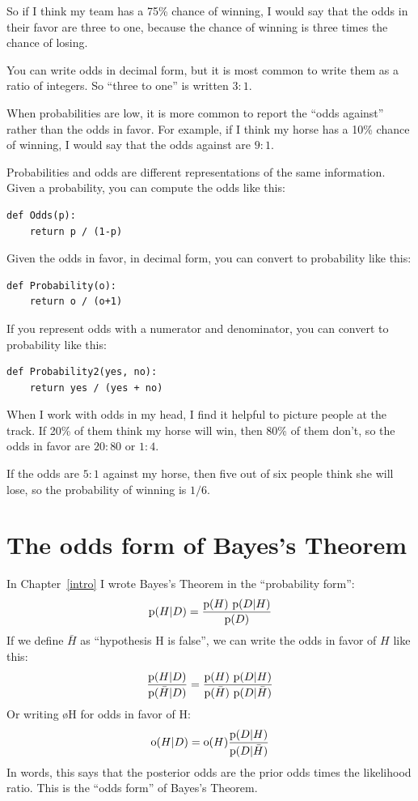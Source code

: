 \documentclass[12pt]{book}
\begin{document}
So if I think my team has a 75\% chance of winning, I would
say that the odds in their favor are three to one, because
the chance of winning is three times the chance of losing.

You can write odds in decimal form, but it is most common to
write them as a ratio of integers.  So ``three to one'' is
written $3:1$.

When probabilities are low, it is more common to report the
``odds against'' rather than the odds in favor.  For
example, if I think my horse has a 10\% chance of winning,
I would say that the odds against are $9:1$.

Probabilities and odds are different representations of the
same information.  Given a probability, you can compute the
odds like this:

\begin{verbatim}
def Odds(p):
    return p / (1-p)
\end{verbatim}

Given the odds in favor, in decimal form, you can convert to
probability like this:

\begin{verbatim}
def Probability(o):
    return o / (o+1)
\end{verbatim}

If you represent odds with a numerator and denominator, you
can convert to probability like this:

\begin{verbatim}
def Probability2(yes, no):
    return yes / (yes + no)
\end{verbatim}

When I work with odds in my head, I find it helpful to picture
people at the track.  If 20\% of them think my horse will win,
then 80\% of them don't, so the odds in favor are $20:80$ or
$1:4$.

If the odds are $5:1$ against my horse, then five out of six
people think she will lose, so the probability of winning
is $1/6$.


\section{The odds form of Bayes's Theorem}

In Chapter~\ref{intro} I wrote Bayes's Theorem in the ``probability
form'':
%
\[ \mathrm{p}(H|D) = \frac{\mathrm{p}(H)~\mathrm{p}(D|H)}{\mathrm{p}(D)} \]
%
If we define $\bar{H}$ as ``hypothesis H is false'', we can write the
odds in favor of $H$ like this:
%
\[ \frac{\mathrm{p}(H|D)}{\mathrm{p}(\bar{H}|D)} = \frac{\mathrm{p}(H)~\mathrm{p}(D|H)}
                                        {\mathrm{p}(\bar{H})~\mathrm{p}(D|\bar{H})} \]
%
Or writing \o{H} for odds in favor of H:
%
\[ \mathrm{o}(H|D) = \mathrm{o}(H) \frac{\mathrm{p}(D|H)}{\mathrm{p}(D|\bar{H})} \]
%
In words, this says that the posterior odds are the prior odds times
the likelihood ratio.  This is the ``odds form'' of Bayes's Theorem.
\end{document}
